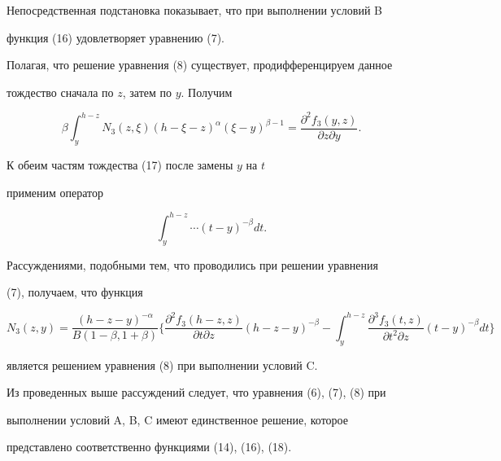 Непосредственная подстановка показывает, что при выполнении условий B 


функция (16) удовлетворяет уравнению (7). 


 


Полагая, что решение уравнения (8) существует, продифференцируем данное 


тождество сначала по $z$, затем по $y$. Получим 


\begin{equation} 


\beta\int^{h-z}_y N_3(z,\xi)(h-\xi-z)^\alpha 


(\xi-y)^{\beta-1}= 


\frac{\partial^2f_3(y,z)}{\partial z\partial y}. 


\end{equation} 


К обеим частям тождества (17) после  замены $y$ на $t$ 


применим оператор 


$$ 


\int^{h-z}_y\dotsb(t-y)^{-\beta}dt. 


$$ 


Рассуждениями, подобными тем, что проводились при решении уравнения 


(7), получаем, что функция 


\begin{equation} 


N_3(z,y)=\frac{(h-z-y)^{-\alpha}}{B(1-\beta,1+\beta)}\bigg\{ 


\frac{\partial^2f_3(h-z,z)}{\partial t\partial z} 


(h-z-y)^{-\beta}-\int^{h-z}_y 


\frac{\partial^3f_3(t,z)}{\partial t^2\partial z} 


(t-y)^{-\beta}dt\bigg\} 


\end{equation} 


является решением уравнения (8) при выполнении условий C. 


 


Из проведенных выше рассуждений следует, что уравнения (6), (7), (8) при 


выполнении условий A, B, C имеют единственное решение, которое 


представлено соответственно функциями (14), (16), (18). 


